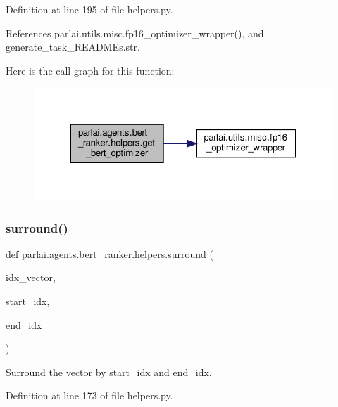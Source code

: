 Definition at line 195 of file helpers.\+py.



References parlai.\+utils.\+misc.\+fp16\+\_\+optimizer\+\_\+wrapper(), and generate\+\_\+task\+\_\+\+R\+E\+A\+D\+M\+Es.\+str.

Here is the call graph for this function\+:
\nopagebreak
\begin{figure}[H]
\begin{center}
\leavevmode
\includegraphics[width=323pt]{namespaceparlai_1_1agents_1_1bert__ranker_1_1helpers_a7a144c1f6c9af7925e754b9b61c0e6fb_cgraph}
\end{center}
\end{figure}
\mbox{\label{namespaceparlai_1_1agents_1_1bert__ranker_1_1helpers_ae5621255d8851c9628c116cb6db4c28c}} 
\subsubsection{\texorpdfstring{surround()}{surround()}}
{\footnotesize\ttfamily def parlai.\+agents.\+bert\+\_\+ranker.\+helpers.\+surround (\begin{DoxyParamCaption}\item[{}]{idx\+\_\+vector,  }\item[{}]{start\+\_\+idx,  }\item[{}]{end\+\_\+idx }\end{DoxyParamCaption})}

\begin{DoxyVerb}Surround the vector by start_idx and end_idx.\end{DoxyVerb}
 

Definition at line 173 of file helpers.\+py.



